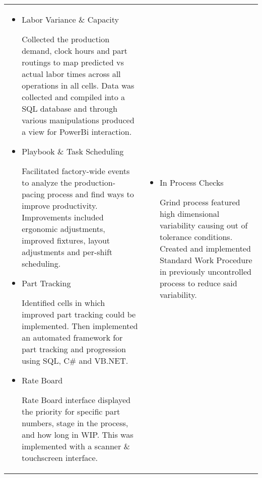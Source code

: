 \documentclass[a4paper, oneside, final, 10pt]{scrartcl} %
\newcommand{\Csharp}{C{\lserif\#}}
\begin{document}
\begin{center}
\vspace{-10pt}
\begin{tabularx}{0.97\linewidth}{X|X}
    \vspace{-10pt}
    \begin{itemize}\setlength\itemsep{0em}
        \item{Labor Variance \&{} Capacity}
        \begin{sloppypar}
            Collected the production demand, clock hours and part routings to map predicted vs actual labor times across all operations in all cells.
            Data was collected and compiled into a SQL database and through various manipulations produced a view for PowerBi interaction.
        \end{sloppypar}
        \item{Playbook \&{} Task Scheduling}
        \begin{sloppypar}
            Facilitated factory-wide events to analyze the production-pacing process and find ways to improve productivity.
            Improvements included ergonomic adjustments, improved fixtures, layout adjustments and per-shift scheduling.
        \end{sloppypar}
        \item{Part Tracking}
        \begin{sloppypar}
            Identified cells in which improved part tracking could be implemented.
            Then implemented an automated framework for part tracking and progression using SQL, \Csharp{} and VB.NET.
        \end{sloppypar}
        \item {Rate Board}
        \begin{sloppypar}
            Rate Board interface displayed the priority for specific part numbers, stage in the process, and how long in WIP. \@{}
            This was implemented with a scanner \& touchscreen interface.
        \end{sloppypar}
    \end{itemize} & \vspace{-10pt} \begin{itemize}\setlength\itemsep{0em}
        \item{In Process Checks}
        \begin{sloppypar}
            Grind process featured high dimensional variability causing out of tolerance conditions.
            Created and implemented Standard Work Procedure in previously uncontrolled process to reduce said variability.
        \end{sloppypar}

\end{itemize}
\end{tabularx}
\end{center}
\end{document}
